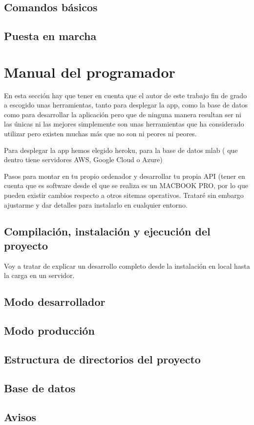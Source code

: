 \subsection{Comandos básicos}\label{cbasicos}

\subsection{Puesta en marcha}\label{typesript}


\section{Manual del programador}
En esta sección hay que tener en cuenta que el autor de este trabajo fin de grado a escogido unas herramientas, tanto para desplegar la app, como la base de datos como para desarrollar la aplicación pero que de ninguna manera resultan ser ni las únicas ni las mejores simplemente son unas herramientas que ha considerado utilizar pero existen muchas más que no son ni peores ni peores. 

Para desplegar la app hemos elegido heroku, para la base de datos mlab ( que dentro tiene servidores AWS, Google Cloud o Azure)

Pasos para montar en tu propio ordenador y desarrollar tu propia API (tener en cuenta que es software desde el que se realiza es un MACBOOK PRO, por lo que pueden existir cambios respecto a otros sitemas operativos. Trataré sin embargo ajustarme y dar detalles para instalarlo en cualquier entorno.

\subsection{Compilación, instalación y ejecución del proyecto}
Voy a tratar de explicar un desarrollo completo desde la instalación en local hasta la carga en un servidor. 


\subsection{Modo desarrollador }

\subsection{Modo producción}

\subsection{Estructura de directorios del proyecto}

\subsection{Base de datos}




\subsection{Avisos}



